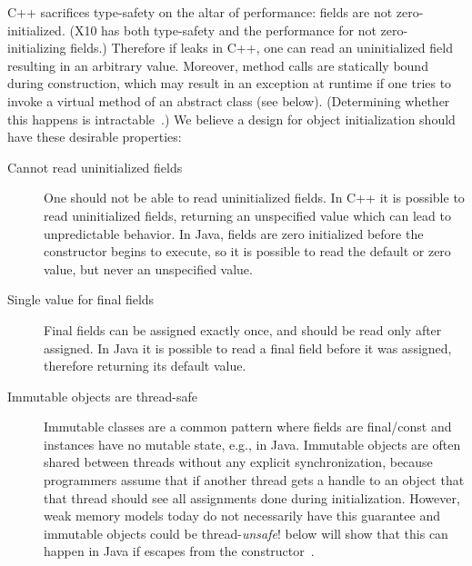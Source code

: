 \mbox{C++} sacrifices type-safety on the altar of performance: %
    fields are not zero-initialized.
    (X10 has both type-safety and the performance for not zero-initializing fields.)
Therefore if \this leaks in \mbox{C++},
    one can read an uninitialized field resulting in an arbitrary value.
Moreover, method calls are statically bound during construction,
    which may result in an exception at runtime
    if one tries to invoke a virtual method of an abstract class (see  below).
(Determining whether this happens is intractable~\cite{Gil:1998:CTA:646155.679689}.)
We believe a design for object initialization should have these
    desirable properties:
\begin{description}

  \item[Cannot read uninitialized fields]
    One should not be able to read uninitialized fields.
    In \mbox{C++} it is possible to read uninitialized fields,
        returning an unspecified value which can lead to unpredictable behavior.
    In Java, fields are zero initialized before the constructor begins to execute,
        so it is possible to read the default or zero value,
        but never an unspecified value.

  \item[Single value for final fields]
    Final fields can be assigned exactly once, and
        should be read only after assigned.
    In Java it is possible to read a final field before it was assigned,
        therefore returning its default value.

  \item[Immutable objects are thread-safe]
    Immutable classes are a common pattern where fields are final/const
        and instances have no mutable state, e.g.,  in Java.
    Immutable objects are often shared between threads without any explicit synchronization,
        because programmers assume that if another thread gets a handle to an object
        that that thread should see all assignments done during initialization.
    However, weak memory models today do not necessarily have this guarantee
        and immutable objects could be thread-\emph{unsafe}!
     below will show that this can happen in Java
        if \this escapes from the constructor~\cite{JSR133}.


\end{description}
